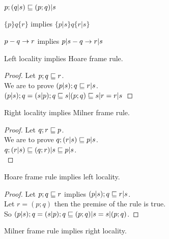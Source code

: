 \documentclass{article}
\begin{document}
\begin{law}
$p; (q | s) \sqsubseteq (p; q) | s$
\end{law}

\begin{rul}
$\{p\} q \{r\}$ implies $\{p | s\} q \{r | s\}$
\end{rul}

\begin{rul}
$p-q\rightarrow r$ implies $p | s-q\rightarrow r | s$
\end{rul}

\begin{theorem}
Left locality implies Hoare frame rule.
\end{theorem}

\verified

\begin{proof}
Let $p; q \sqsubseteq r$.\\
We are to prove $(p | s); q \sqsubseteq r | s$.\\
$(p | s); q = (s | p); q \sqsubseteq s | (p ; q) \sqsubseteq s | r = r | s$
\end{proof}

\begin{theorem}
Right locality implies Milner frame rule.
\end{theorem}

\verified

\begin{proof}
Let $q; r \sqsubseteq p$.\\
We are to prove $q; (r | s) \sqsubseteq p | s$.\\
$q; (r |s) \sqsubseteq (q; r) | s \sqsubseteq p | s$.\\
\end{proof}

\begin{theorem}
Hoare frame rule implies left locality.
\end{theorem}

\verified

\begin{proof}
Let $p; q \sqsubseteq r$ implies $(p | s); q \sqsubseteq r | s$.\\
Let $r = (p; q)$ then the premise of the rule is true.\\
So $(p | s); q = (s | p); q \sqsubseteq (p; q) | s = s | (p; q)$.
\end{proof}

\begin{theorem}
Milner frame rule implies right locality.
\end{theorem}
\end{document}
